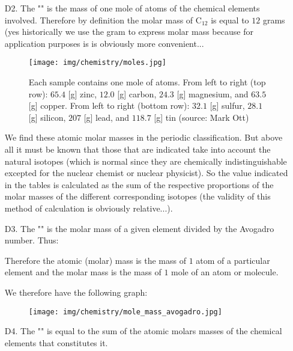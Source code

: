 \begin{enumerate}
		\item[D2.] The "\label{molar mass}" is the mass of one mole of atoms of the chemical elements involved. Therefore by definition the molar mass of $\mathrm{C}_{12}$ is equal to $12$ grams (yes historically we use the gram to express molar mass because for application purposes is is obviously more convenient...
		\begin{figure}[H]
			\centering
			\texttt{[image: img/chemistry/moles.jpg]}
			\caption[]{Each sample contains one mole of atoms. From left to right (top row): $65.4$ [g] zinc, $12.0$ [g] carbon, $24.3$ [g] magnesium, and $63.5$ [g] copper. From left to right (bottom row): $32.1$ [g] sulfur, $28.1$ [g] silicon, $207$ [g] lead, and $118.7$ [g] tin (source: Mark Ott)}
		\end{figure}
		\begin{tcolorbox}[title=Remark,colframe=black,arc=10pt]
		We find these atomic molar masses in the periodic classification. But above all it must be known that those that are indicated take into account the natural isotopes (which is normal since they are chemically indistinguishable excepted for the nuclear chemist or nuclear physicist). So the value indicated in the tables is calculated as the sum of the respective proportions of the molar masses of the different corresponding isotopes (the validity of this method of calculation is obviously relative...).
		\end{tcolorbox}	
		
		\item[D3.] The "" is the molar mass of a given element divided by the Avogadro number. Thus:
		
		Therefore the atomic (molar) mass is the mass of $1$ atom of a particular element and the molar mass is the mass of $1$ mole of an atom or molecule.
		
		We therefore have the following graph:
		\begin{figure}[H]
			\begin{center}
				\texttt{[image: img/chemistry/mole\_mass\_avogadro.jpg]}
			\end{center}	
		\end{figure}
		
		\item[D4.] The "" is equal to the sum of the atomic molars  masses of the chemical elements that constitutes it.
		

\end{enumerate}
